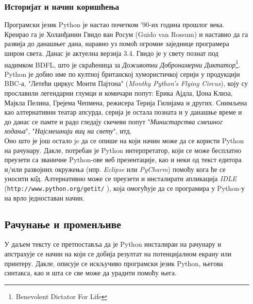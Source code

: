 \documentclass[11pt, serbianc, english, titlepage]{article}
\begin{document}
		\subsubsection{Историјат и начин коришћења}
		Програмски језик Python је настао почетком '90-их година прошлог века. Креирао га је Холанђанин Гвидо ван Росум (Guido van Rossum) и наставио да га развија до данашњег дана, наравно уз помоћ огромне заједнице програмера широм света. Данас је актуелна верзија 3.4. Гвидо је у свету познат под надимком BDFL, што је скраћеница за \emph{Доживотни Добронамерни Диктатор}\footnote{Benevolent Dictator For Life}.\\
		Python је добио име по култној британској хумористичкој серији у продукцији BBC-а, "Летећи циркус Монти Пајтона" (\emph{Monthy Python's Flying Circus}), коју су прославили легендарни глумци и комичари попут: Ерика Ајдла, Џона Клиза, Мајкла Пелина, Грејема Чепмена, режисера Терија Гилијама и других. Снимљена као алтернативни театар апсурда, серија је остала позната и у данашње време и до данас се памте и радо гледају скечеви попут "\emph{Министарства смешног ходања}", "\emph{Најсмешнији виц на свету}", итд.\\
		Оно што је још остало je да се опише на који начин може да се користи Python на рачунару. Дакле, потребан је Python интерпретатор, који се може бесплатно преузети са званичне Python-ове веб презентације\cite{pythonsite}, као и неки од текст едитора и/или развојних окружења (нпр. \emph{Eclipse} или \emph{PyCharm}) помоћу кога ће се уносити к\^{о}д. Алтернативно може се преузети и инсталирати апликација \emph{IDLE} (\texttt{http://www.python.org/getit/} ), која омогућује да се програмира у Python-у на врло једноставан начин.\\
		\subsection{Рачунање и променљиве}
		У даљем тексту се претпоставља да је Python инсталиран на рачунару и апстрахује се начин на који се добија резултат на потенцијалном екрану или принтеру. Дакле, описује се искључиво програмски језик Python, његова синтакса, као и шта се све може да урадити помоћу њега.
\end{document}
